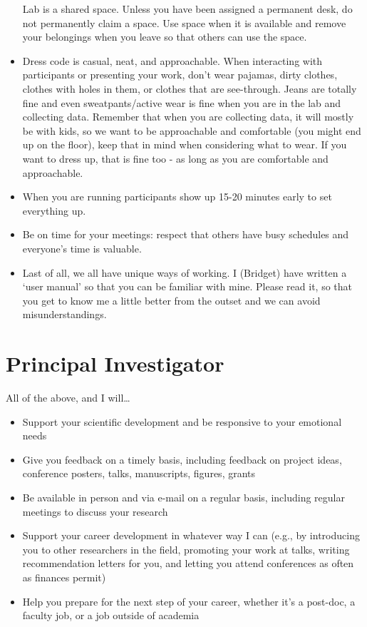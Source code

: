 \documentclass[]{book}
\providecommand{\tightlist}{%
  \setlength{\itemsep}{0pt}\setlength{\parskip}{0pt}}
\begin{document}
\begin{itemize}
  Lab is a shared space. Unless you have been assigned a permanent desk, do not permanently claim a space. Use space when it is available and remove your belongings when you leave so that others can use the space.
\item
  Dress code is casual, neat, and approachable. When interacting with participants or presenting your work, don't wear pajamas, dirty clothes, clothes with holes in them, or clothes that are see-through. Jeans are totally fine and even sweatpants/active wear is fine when you are in the lab and collecting data. Remember that when you are collecting data, it will mostly be with kids, so we want to be approachable and comfortable (you might end up on the floor), keep that in mind when considering what to wear. If you want to dress up, that is fine too - as long as you are comfortable and approachable.
\item
  When you are running participants show up 15-20 minutes early to set everything up.
\item
  Be on time for your meetings: respect that others have busy schedules and everyone's time is valuable.
\item
  Last of all, we all have unique ways of working. I (Bridget) have written a `user manual' so that you can be familiar with mine. Please read it, so that you get to know me a little better from the outset and we can avoid misunderstandings.
\end{itemize}

\hypertarget{principal-investigator}{%
\section{Principal Investigator}\label{principal-investigator}}

All of the above, and I will\ldots{}

\begin{itemize}
\tightlist
\item
  Support your scientific development and be responsive to your emotional needs
\item
  Give you feedback on a timely basis, including feedback on project ideas, conference posters, talks, manuscripts, figures, grants
\item
  Be available in person and via e-mail on a regular basis, including regular meetings to discuss your research
\item
  Support your career development in whatever way I can (e.g., by introducing you to other researchers in the field, promoting your work at talks, writing recommendation letters for you, and letting you attend conferences as often as finances permit)
\item
  Help you prepare for the next step of your career, whether it's a post-doc, a faculty job, or a job outside of academia
\end{itemize}
\end{document}
